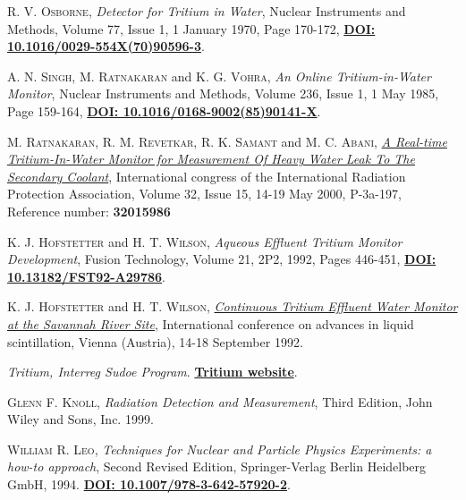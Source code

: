 \begin{thebibliography}{100}
 \textsc{R. V. Osborne},
\textit{Detector for Tritium in Water}, Nuclear Instruments and Methods, Volume 77, Issue 1, 1 January 1970, Page 170-172, \href{https://doi.org/10.1016/0029-554X(70)90596-3}{\textbf{DOI: 10.1016/0029-554X(70)90596-3}}.

 \textsc{A. N. Singh}, \textsc{M. Ratnakaran} and \textsc{K. G. Vohra},
\textit{An Online Tritium-in-Water Monitor}, Nuclear Instruments and Methods, Volume 236, Issue 1, 1 May 1985, Page 159-164, \href{https://doi.org/10.1016/0168-9002(85)90141-X}{\textbf{DOI: 10.1016/0168-9002(85)90141-X}}.

 \textsc{M. Ratnakaran}, \textsc{R. M. Revetkar}, \textsc{R. K. Samant} and \textsc{M. C. Abani},
\href{https://inis.iaea.org/search/search.aspx?orig_q=RN:32015986}{\textit{A Real-time Tritium-In-Water Monitor for Measurement Of Heavy Water Leak To The Secondary Coolant}}, International congress of the International Radiation Protection Association, Volume 32, Issue 15, 14-19 May 2000, P-3a-197, Reference number: \textbf{32015986}

 \textsc{K. J. Hofstetter} and \textsc{H. T. Wilson},
\textit{Aqueous Effluent Tritium Monitor Development}, Fusion Technology, Volume 21, 2P2, 1992, Pages 446-451, \href{https://doi.org/10.13182/FST92-A29786}{\textbf{DOI: 10.13182/FST92-A29786}}.

 \textsc{K. J. Hofstetter} and \textsc{H. T. Wilson},
\href{https://www.osti.gov/biblio/6865647-continuous-tritium-effluent-water-monitor-savannah-river-site}{\textit{Continuous Tritium Effluent Water Monitor at the Savannah River Site}}, International conference on advances in liquid scintillation, Vienna (Austria), 14-18 September 1992.

 \textit{Tritium, Interreg Sudoe Program}. 
\href{https://tritium-sudoe.eu/es-es/homepage}{\textbf{Tritium website}}.

 \textsc{Glenn F. Knoll}, 
\textit{Radiation Detection and Measurement}, Third Edition, John Wiley and Sons, Inc. 1999.

 \textsc{William R. Leo},
\textit{Techniques for Nuclear and Particle Physics Experiments: a how-to approach}, Second Revised Edition, Springer-Verlag Berlin Heidelberg GmbH, 1994. \href{https://doi.org/10.1007/978-3-642-57920-2}{\textbf{DOI: 10.1007/978-3-642-57920-2}}. 


\end{thebibliography}
